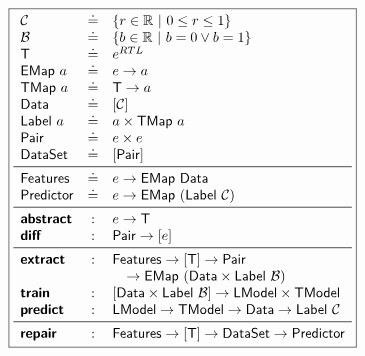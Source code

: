 \begin{figure}
\small
\begin{minipage}[c]{\linewidth}
  \lstDeleteShortInline{|}
  \[
  \boxed{
  \begin{array}{lcl}
    \Conf         & \defeq & \{r \in \R\ |\ 0 \le r \le 1\} \\
    \ConfBin      & \defeq & \{b \in \R\ |\ b = 0 \vee b = 1\} \\
    \T            & \defeq & e^{RTL} \\
    \Emap{a}      & \defeq & e \to a \\
    \Tmap{a}      & \defeq & \T \to a \\
    \datasym      & \defeq & \List{\Conf} \\
    \labelsym{a}  & \defeq & a \times \Tmap{a} \\
    \pairsym      & \defeq & e \times e \\
    \datasetsym   & \defeq & \List{\pairsym} \\
    \midrule
    \featuresym   & \defeq & e \to \Emap{\datasym} \\
    \predictorsym & \defeq & e \to \Emap{(\labelsym{\Conf})} \\
    \midrule
    \abstrsym   & : & e \to \T \\
    \diffsym    & : & \pairsym \to \List{e} \\
    \midrule
    \extractsym & : & \featuresym \to \List{\T} \to \pairsym \\
                &   & \quad \to \Emap{(\datasym \times \labelsym{\ConfBin})} \\
    \trainsym   & : & \List{\datasym \times \labelsym{\ConfBin}} \to \Model \times \ModelT \\
    \predictsym & : & \Model \to \ModelT \to \datasym \to \labelsym{\Conf} \\
    \midrule
    \repairsym  & : & \featuresym \to \List{\T} \to \datasetsym \to \predictorsym \\
  \end{array}
  }
  \]
  \lstMakeShortInline[mathescape=true]{|}
  \label{fig:api}
\end{minipage}
\end{figure}
